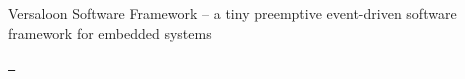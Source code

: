 \label{index_mainpage}%
%
Versaloon Software Framework -- a tiny preemptive event-\/driven software framework for embedded systems

\href{https://github.com/vsfteam/vsf/actions/workflows/vsf-actions.yml}{\texttt{ }} 